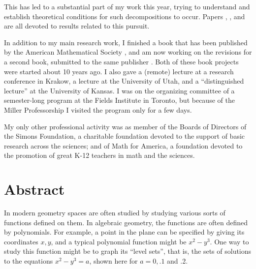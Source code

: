 \documentclass[11pt]{amsart}
\begin{document}
This has led to a substantial part of my work this year, trying to understand and establish theoretical
conditions for such decompositions to occur. Papers \cite{de3}, \cite{de0a}, \cite{de2} and \cite{de1} are all 
devoted to results related to this pursuit.
 
   
In addition to my main research work, I finished a book that has been published by the American Mathematical Society \cite{de4}, and am now working on the revisions for a second book, submitted to the same publisher \cite{de5}. Both of these book projects were started about 10 years ago. I also gave a (remote) lecture at a research conference in Krakow, a lecture at the University of Utah, and a ``distinguished lecture''  at the University of Kansas. I was on the organizing committee of a semester-long program at the Fields Institute in Toronto, but because of the Miller Professorship I visited the program only for a few days.

My only other professional  activity was as member of the Boards of Directors of the Simons Foundation, a charitable foundation devoted to the support of basic research across the sciences; and of Math for America, a foundation devoted to the promotion of great K-12 teachers in math and the sciences.


\section{Abstract}
In modern geometry spaces are often studied by studying various sorts of functions defined on them. In algebraic geometry, the functions are often defined by polynomials. For example, a point in the plane can be specified by giving its coordinates $x,y$, and a typical polynomial function might be $x^2-y^3$. One way to study this function might be to graph its ``level sets'', that is, the sets of solutions to the equations $x^2-y^3 = a$, shown here for $a = 0,.1$ and .2.
\end{document}
